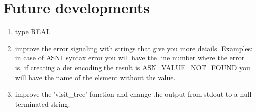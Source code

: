 \section{Future developments}
\begin{enumerate}
\item type REAL 
\item improve the error signaling with strings that give you more details. 
   Examples: in case of ASN1 syntax error you will have the line number where the error is,  
             if creating a der encoding the result is ASN\_VALUE\_NOT\_FOUND you will have the
             name of the element without the value.
\item improve the 'visit\_tree' function and change the output from stdout to a null terminated 
   string.  

\end{enumerate}


